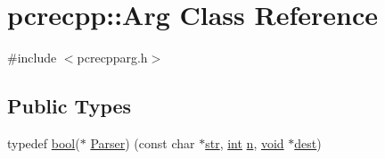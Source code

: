 \hypertarget{classpcrecpp_1_1Arg}{}\section{pcrecpp\+:\+:Arg Class Reference}
\label{classpcrecpp_1_1Arg}


{\ttfamily \#include $<$pcrecpparg.\+h$>$}

\subsection*{Public Types}
\begin{DoxyCompactItemize}
\item 
typedef \hyperlink{aplibtool_8c_ad5c9d4ba3dc37783a528b0925dc981a0}{bool}($\ast$ \hyperlink{classpcrecpp_1_1Arg_a311bfa3975ffb650e0168fcc3cc47316}{Parser}) (const char $\ast$\hyperlink{group__APR__Util__Bucket__Brigades_ga6a62b60443be1d042194af15ce934193}{str}, \hyperlink{pcre_8txt_a42dfa4ff673c82d8efe7144098fbc198}{int} \hyperlink{pcregrep_8txt_ab232d334efb9173a12ae2940d035f460}{n}, \hyperlink{group__MOD__ISAPI_gacd6cdbf73df3d9eed42fa493d9b621a6}{void} $\ast$\hyperlink{group__apr__thread__proc_gaaf051c44ea7115367430b40d8fdd496e}{dest})
\end{DoxyCompactItemize}
